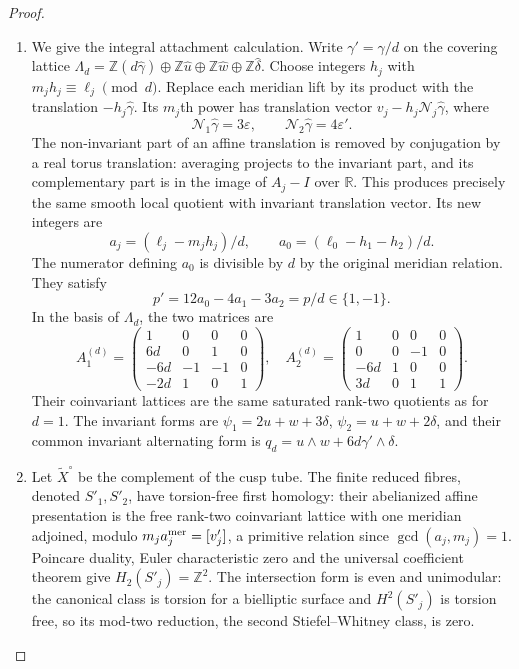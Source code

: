 \begin{proof}
\begin{enumerate}[label=\arabic*.,leftmargin=*]
\item We give the integral attachment calculation. Write
$\gamma'=\gamma/d$ on the covering lattice
$\Lambda_d=\mathbb Z(d\widehat\gamma)\oplus\mathbb Z\widehat u
\oplus\mathbb Z\widehat w\oplus\mathbb Z\widehat\delta$.
Choose integers $h_j$ with
$m_jh_j\equiv\ell_j\pmod d$. Replace each meridian lift by its
product with the translation $-h_j\widehat\gamma$. Its $m_j$th power
has translation vector
$v_j-h_j\mathcal N_j\widehat\gamma$, where
\[
 \mathcal N_1\widehat\gamma=3\varepsilon,
 \qquad \mathcal N_2\widehat\gamma=4\varepsilon'.
\]
The non-invariant part of an affine translation is removed by
conjugation by a real torus translation: averaging projects to the
invariant part, and its complementary part is in the image of $A_j-I$
over $\mathbb R$. This produces precisely the same smooth local
quotient with invariant translation vector. Its new integers are
\[
 a_j=(\ell_j-m_jh_j)/d,\qquad
 a_0=(\ell_0-h_1-h_2)/d.
\]
The numerator defining $a_0$ is divisible by $d$ by the original
meridian relation. They satisfy
\[
 p'=12a_0-4a_1-3a_2=p/d\in\{1,-1\}.
\]
In the basis of $\Lambda_d$, the two matrices are
\[
 A_1^{(d)}=\begin{pmatrix}1&0&0&0\\6d&0&1&0\\-6d&-1&-1&0\\-2d&1&0&1\end{pmatrix},
 \quad
 A_2^{(d)}=\begin{pmatrix}1&0&0&0\\0&0&-1&0\\-6d&1&0&0\\3d&0&1&1\end{pmatrix}.
\]
Their coinvariant lattices are the same saturated rank-two quotients
as for $d=1$. The invariant forms are
$\psi_1=2u+w+3\delta$, $\psi_2=u+w+2\delta$,
and their common invariant alternating form is
$q_d=u\wedge w+6d\gamma'\wedge\delta$.

\item Let $\widetilde X^\circ$ be the complement of the cusp tube. The
finite reduced fibres, denoted $S'_1,S'_2$, have torsion-free first
homology: their abelianized affine presentation is the free rank-two
coinvariant lattice with one meridian adjoined, modulo
$m_ja_j^{\rm mer}=[v'_j]$, a primitive relation since
$\gcd(a_j,m_j)=1$. Poincare duality, Euler characteristic zero and
the universal coefficient theorem give $H_2(S'_j)=\mathbb Z^2$.
The intersection form is even and unimodular: the canonical class is
torsion for a bielliptic surface and $H^2(S'_j)$ is torsion free,
so its mod-two reduction, the second Stiefel--Whitney class, is zero.


\end{enumerate}
\end{proof}
